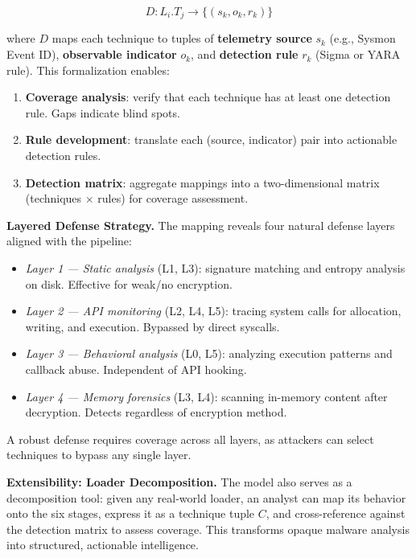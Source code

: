 \documentclass[10pt,a4paper,twocolumn]{article}
\begin{document}
\begin{equation}
    D: L_i.T_j \rightarrow \{(s_k, o_k, r_k)\}
    \label{eq:detection_map}
\end{equation}

\noindent where $D$ maps each technique to tuples of \textbf{telemetry source} $s_k$ (e.g., Sysmon Event ID), \textbf{observable indicator} $o_k$, and \textbf{detection rule} $r_k$ (Sigma or YARA rule).
This formalization enables:

\begin{enumerate}[leftmargin=*, itemsep=1pt]
    \item \textbf{Coverage analysis}: verify that each technique has at least one detection rule. Gaps indicate blind spots.
    \item \textbf{Rule development}: translate each (source, indicator) pair into actionable detection rules.
    \item \textbf{Detection matrix}: aggregate mappings into a two-dimensional matrix (techniques $\times$ rules) for coverage assessment.
\end{enumerate}

\textbf{Layered Defense Strategy.}
The mapping reveals four natural defense layers aligned with the pipeline:

\begin{itemize}[leftmargin=*, itemsep=1pt]
    \item \textit{Layer 1 --- Static analysis} (L1, L3): signature matching and entropy analysis on disk. Effective for weak/no encryption.
    \item \textit{Layer 2 --- API monitoring} (L2, L4, L5): tracing system calls for allocation, writing, and execution. Bypassed by direct syscalls.
    \item \textit{Layer 3 --- Behavioral analysis} (L0, L5): analyzing execution patterns and callback abuse. Independent of API hooking.
    \item \textit{Layer 4 --- Memory forensics} (L3, L4): scanning in-memory content after decryption. Detects regardless of encryption method.
\end{itemize}

A robust defense requires coverage across all layers, as attackers can select techniques to bypass any single layer.

\textbf{Extensibility: Loader Decomposition.}
The model also serves as a decomposition tool: given any real-world loader, an analyst can map its behavior onto the six stages, express it as a technique tuple $C$, and cross-reference against the detection matrix to assess coverage.
This transforms opaque malware analysis into structured, actionable intelligence.
\end{document}
